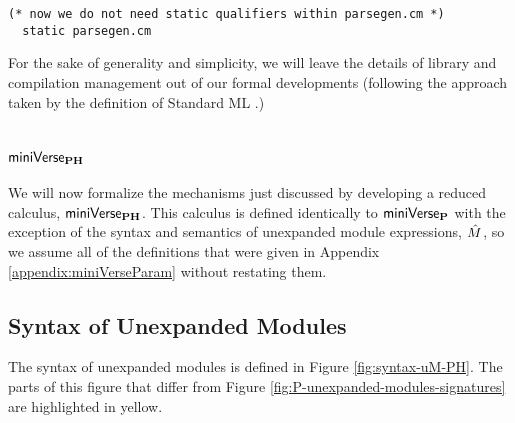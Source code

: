 {\begin{lstlisting}[numbers=none,morekeywords={Library,is}]
  (* now we do not need static qualifiers within parsegen.cm *)
  static parsegen.cm 
\end{lstlisting}
For the sake of generality and simplicity, we will leave the details of library and compilation management out of our formal developments (following the approach taken by the definition of Standard ML \cite{Tofte:89:TheDefinitionOfStandardML}.)

\section{$\mathsf{miniVerse}_\textbf{PH}$}
We will now formalize the mechanisms just discussed by developing a reduced calculus, $\mathsf{miniVerse}_\textbf{PH}$. This calculus is defined identically to $\mathsf{miniVerse}_\textbf{P}$ with the exception of the syntax and semantics of unexpanded module expressions, ${\hat M}$, so we assume all of the definitions that were given in Appendix \ref{appendix:miniVerseParam} without restating them. 

\subsection{Syntax of Unexpanded Modules}
The syntax of unexpanded modules is defined in Figure \ref{fig:syntax-uM-PH}. The parts of this figure that differ from Figure \ref{fig:P-unexpanded-modules-signatures} are highlighted in yellow.

}
